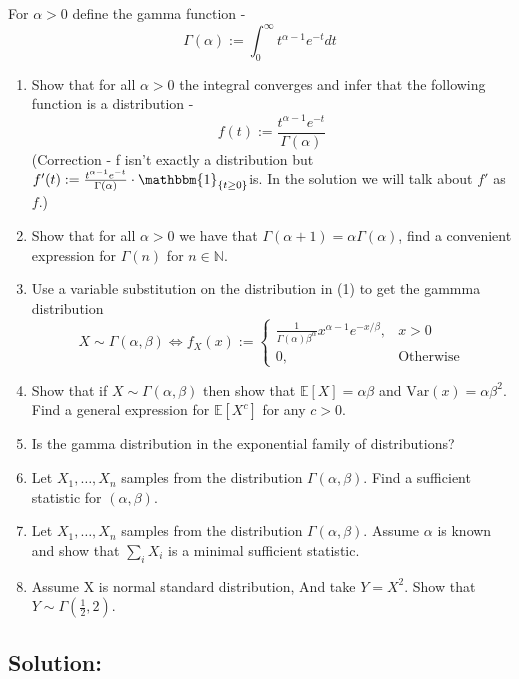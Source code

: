\documentclass[../main.tex]{subfiles}
\begin{document}
For $\alpha>0$ define the gamma function - 
\[\Gamma(\alpha):=\int_0^\infty t^{\alpha-1}e^{-t} dt\]
\begin{enumerate}


    \item Show that for all $\alpha>0$ the integral converges and infer that the following function is a distribution - 
    \[f(t):=\frac{t^{\alpha-1}e^{-t}}{\Gamma(\alpha)}\]
    (Correction - f isn't exactly a distribution but $f'(t):=\frac{t^{\alpha-1}e^{-t}}{\Gamma(\alpha)}\cdot\mathbbm{1}_{\{t\geq 0\}}$is. In the solution we will talk about $f'$ as $f$.)
    
    \item Show that for all $\alpha>0$ we have that $\Gamma(\alpha+1)=\alpha\Gamma(\alpha)$, find a convenient expression for $\Gamma(n)$ for $n\in\mathbb{N}$.

    \item Use a variable substitution on the distribution in (1) to get the gammma distribution
    \[X\sim\Gamma(\alpha,\beta)\Longleftrightarrow f_X(x):=\begin{cases}\frac{1}{\Gamma(\alpha)\beta^{\alpha}}x^{\alpha-1}e^{-x/\beta}, & x>0 \\ 0 ,& \text{Otherwise}\end{cases}\]
    \item Show that if $X\sim\Gamma(\alpha,\beta)$ then show that $\mathbb{E}[X]=\alpha\beta$ and $\text{Var}(x)=\alpha\beta^2$. Find a general expression for $\mathbb{E}[X^c]$ for any $c>0$.
    
    \item Is the gamma distribution in the exponential family of distributions?
    
    \item Let $X_1,\dots,X_n$ samples from the distribution $\Gamma(\alpha,\beta)$. Find a sufficient statistic for $(\alpha,\beta)$.
    
    \item Let $X_1,\dots,X_n$ samples from the distribution $\Gamma(\alpha,\beta)$. Assume $\alpha$ is known and show that $\sum_i X_i$ is a minimal sufficient statistic. 
    
    \item Assume X is normal standard distribution, And take $Y=X^2$. Show that $Y\sim \Gamma(\frac{1}{2},2)$.
    
\end{enumerate}

\newpage

\subsection*{Solution:}
\end{document}
